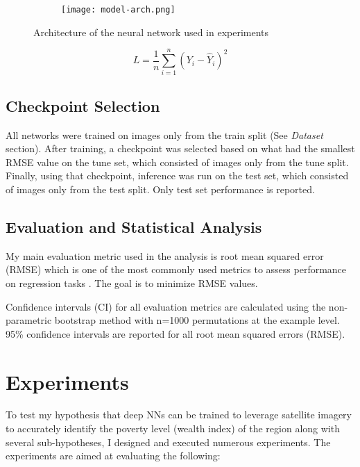 \documentclass{article}
\begin{document}
\begin{figure*}
    \begin{subfigure}{.99\textwidth}
        \centering
        \texttt{[image: model-arch.png]}
    \end{subfigure}
    \caption{Architecture of the neural network used in experiments}
    \label{model-arch}
\end{figure*}


\begin{equation}
    \label{eqn:mse_loss}
    L = \frac{1}{n} \sum_{i=1}^n (Y_i - \hat{Y}_i)^2
\end{equation}

\subsection{Checkpoint Selection}
All networks were trained on images only from the train split (See \emph{Dataset} section). After training, a checkpoint was selected based on what had the smallest RMSE value on the tune set, which consisted of images only from the tune split. Finally, using that checkpoint, inference was run on the test set, which consisted of images only from the test split. Only test set performance is reported.

\subsection{Evaluation and Statistical Analysis}
My main evaluation metric used in the analysis is root mean squared error (RMSE) which is one of the most commonly used metrics to assess performance on regression tasks \cite{rmse}. The goal is to minimize RMSE values. 

Confidence intervals (CI) for all evaluation metrics are calculated using the non-parametric bootstrap method with n=1000 permutations at the example level. 95\% confidence intervals are reported for all root mean squared errors (RMSE).



\section{Experiments}
To test my hypothesis that deep NNs can be trained to leverage satellite imagery to accurately identify the poverty level (wealth index) of the region along with several sub-hypotheses, I designed and executed numerous experiments. The experiments are aimed at evaluating the following:
\end{document}
